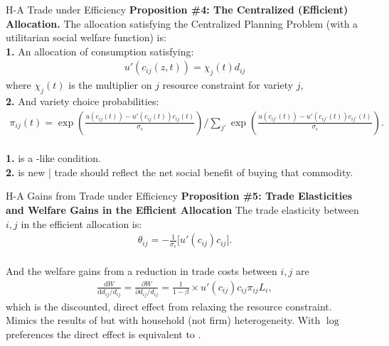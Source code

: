 \documentclass[9pt,pdftex,aspectratio=1610]{beamer}
\theoremstyle{definition}
\begin{document}
\begin{frame}[t]{H-A Trade under Efficiency}
\smallskip
\textbf{Proposition \#4: The Centralized (Efficient) Allocation.} The allocation satisfying the Centralized Planning Problem (with a utilitarian social welfare function) is:\\
\bigskip
\textbf{1.} An allocation of consumption satisfying:
\begin{align}
u'(c_{ij}(z,t) ) = \chi_{j}(t) d_{ij} \nonumber
\end{align}
where $\chi_{j}(t)$ is the multiplier on $j$ resource constraint for variety $j$,\\
\bigskip
\medskip
\textbf{2.} And variety choice probabilities:
\begin{align}
\displaystyle \pi_{ij}(t) =\exp \left( \frac{u(c_{ij}(t)) - u'(c_{ij}(t))c_{ij}(t)}{\sigma_{\epsilon}}\right) \bigg / \sum_{j'}\exp \left( \frac{u(c_{ij'}(t)) - u'(c_{ij'}(t))c_{ij'}(t)}{\sigma_{\epsilon}} \right). \nonumber
\end{align}\\
\bigskip
\medskip
\textbf{1.} is a \citet{backus1993}-like condition. \\
\smallskip
\textbf{2.} is new | trade should reflect the net social benefit of buying that commodity.
\end{frame}

\begin{frame}[t]{H-A Gains from Trade under Efficiency}
\smallskip
\textbf{Proposition \#5: Trade Elasticities and Welfare Gains in the Efficient Allocation} The trade elasticity between $i,j$ in the efficient allocation is:
\begin{align}
\theta_{ij} =  -\frac{1}{\sigma_{\epsilon}} \bigg [ u'(c_{ij}) c_{ij} \bigg]. \nonumber
\end{align}\\
\bigskip
And the welfare gains from a reduction in trade costs between $i,j$ are
\begin{align}
\frac{\mathrm{d} W}{\mathrm{d} d_{ij} / d_{ij}} = \frac{\partial W}{\partial d_{ij} / d_{ij}} = \frac{1}{1-\beta} \times u'(c_{ij}) c_{ij} \pi_{ij} L_i, \nonumber
\end{align}
which is the discounted, direct effect from relaxing the resource constraint.\\
\bigskip
\medskip
Mimics the results of \citet{AtkesonBurstein2010} but with household (not firm) heterogeneity. With $\log$ preferences the direct effect is equivalent to \citet{arkolakis2012new}.\\
\bigskip

\end{frame}
\end{document}
